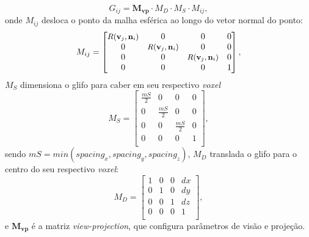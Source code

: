 \begin{equation}
    G_{ij} = \mathbf{M_{vp}}\cdot M_D \cdot M_S \cdot M_{ij},
\end{equation}
onde $M_{ij}$ desloca o ponto da malha esférica ao longo do vetor normal do ponto: 
\begin{equation}
\label{eq::dodf}
    M_{ij} = \begin{bmatrix} 
   \mbox{\small $R( \mathbf{v}_j, \mathbf{n}_i)$} & 0 & 0 & 0 \\
    0 & \mbox{\small $R( \mathbf{v}_j, \mathbf{n}_i)$}  & 0 & 0 \\
    0 & 0 & \mbox{\small $R( \mathbf{v}_j, \mathbf{n}_i)$}  & 0 \\
    0 & 0 & 0 & 1 \\
\end{bmatrix},
\end{equation}
$M_{S}$ dimensiona o glifo para caber em seu respectivo \textit{voxel}
\begin{equation}
    M_{S} = \begin{bmatrix} 
    \frac{mS}{2} & 0             & 0            & 0 \\
    0            & \frac{mS}{2} & 0            & 0 \\
    0            & 0             & \frac{mS}{2} & 0 \\
    0            & 0             & 0            & 1 \\
\end{bmatrix},
\end{equation}
sendo $mS=min(spacing_x , spacing_y , spacing_z)$,
$M_{D}$ translada o glifo para o centro do seu respectivo \textit{voxel}:
\begin{equation}
\label{eq::displace}
    M_{D} = \begin{bmatrix} 
    1 & 0 & 0 & dx \\
    0 & 1 & 0 & dy \\
    0 & 0 & 1 & dz \\
    0 & 0 & 0 & 1 \\
\end{bmatrix},
\end{equation}
e $\mathbf{M_{vp}}$ é a matriz \textit{view-projection}, que configura parâmetros de visão e projeção.



